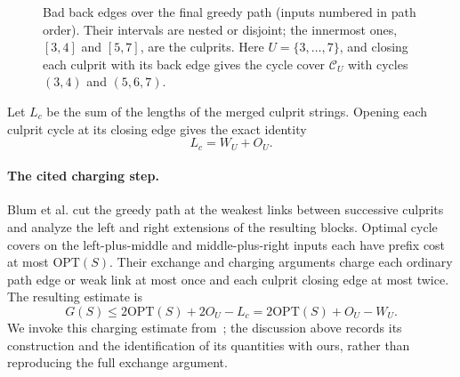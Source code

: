 \documentclass[11pt,a4paper]{article}   %
\theoremstyle{compact}
\theoremstyle{compactdef}
\newcommand{\OPT}{\mathrm{OPT}}
\begin{document}
\begin{figure}[htb]\centering
{}
\caption{Bad back edges over the final greedy path (inputs numbered in
path order). Their intervals are nested or disjoint; the innermost ones,
$[3,4]$ and $[5,7]$, are the culprits. Here $U=\{3,\dots,7\}$, and closing
each culprit with its back edge gives the cycle cover $\mathcal C_U$ with
cycles $(3,4)$ and $(5,6,7)$.}\label{fig:culprits}
\end{figure}

Let $L_c$ be the sum of the lengths of the merged culprit strings.
Opening each culprit cycle at its closing edge gives the exact identity
\[
 L_c=W_U+O_U.
\]

\paragraph{The cited charging step.}
Blum et al. cut the greedy path at the weakest links between successive
culprits and analyze the left and right extensions of the resulting
blocks. Optimal cycle covers on the left-plus-middle and
middle-plus-right inputs each have prefix cost at most $\OPT(S)$.
Their exchange and charging arguments charge each ordinary path edge
or weak link at most once and each culprit closing edge at most twice.
The resulting estimate is
\[
 G(S)\le2\OPT(S)+2O_U-L_c
       =2\OPT(S)+O_U-W_U.
\]
We invoke this charging estimate from~\cite[Lemmas~16--17 and the proof
of Theorem~12]{BJLTY94}; the discussion above records its construction
and the identification of its quantities with ours, rather than
reproducing the full exchange argument.
\end{document}
